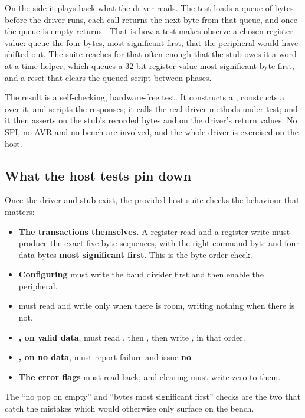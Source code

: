 On the  side it plays back what the driver reads. The test loads a queue of bytes before
the driver runs, each  call returns the next byte from that queue, and once the
queue is empty  returns . That is how a test makes  observe
a chosen register value: queue the four bytes, most significant first, that the peripheral would
have shifted out. The suite reaches for that often enough that the stub owes it a word-at-a-time
helper, which queues a 32-bit register value most significant byte first, and a reset that clears
the queued script between phases.

The result is a self-checking, hardware-free test. It constructs a , constructs a
 over it, and scripts the responses; it calls the real driver methods under test; and it
then asserts on the stub's recorded bytes and on the driver's return values. No SPI, no AVR and no
bench are involved, and the whole driver is exercised on the host.

\subsection{What the host tests pin down}
\label{c8:sec:host_tests}
Once the driver and stub exist, the provided host suite checks the behaviour that matters:
\begin{itemize}
  \item \textbf{The transactions themselves.} A register read and a register write must produce the
    exact five-byte sequences, with the right command byte and four data bytes \textbf{most
    significant first}. This is the byte-order check.
  \item \textbf{Configuring} must write the baud divider first and then enable the peripheral.
  \item \textbf{} must read  and write  only when there is
    room, writing nothing when there is not.
  \item \textbf{, on valid data}, must read , then , then
    write , in that order.
  \item \textbf{, on no data}, must report failure and issue \textbf{no}
    .
  \item \textbf{The error flags} must read back, and clearing must write zero to them.
\end{itemize}
The ``no pop on empty'' and ``bytes most significant first'' checks are the two that catch the
mistakes which would otherwise only surface on the bench.

